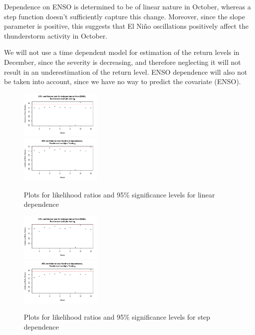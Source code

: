 \documentclass[10pt,conference,compsocconf]{IEEEtran}
\begin{document}
Dependence on ENSO is determined to be of linear nature in October, whereas a step function doesn't sufficiently capture this change. Moreover, since the slope parameter is positive, this suggests that El Niño oscillations positively affect the thunderstorm activity in October. 
\par
We will not use a time dependent model for estimation of the return levels in December, since the severity is decreasing, and therefore neglecting it will not result in an underestimation of the return level.
ENSO dependence will also not be taken into account, since we have no way to predict the covariate (ENSO).

\begin{figure}
	\centering
	\includegraphics[width=0.35\textwidth]{../plots/enso_dependance.pdf}\\
	\includegraphics[width=0.35\textwidth]{../plots/time_dependance.pdf}
	\caption{Plots for likelihood ratios and 95\% significance levels for linear dependence}
	\label{fig:dependance_test}
\end{figure}

\begin{figure}
	\centering
	\includegraphics[width=0.35\textwidth]{../plots/enso_dependance_step.pdf}\\
	\includegraphics[width=0.35\textwidth]{../plots/time_dependance_step.pdf}
	\caption{Plots for likelihood ratios and 95\% significance levels for step dependence}
	\label{fig:dependence_test_step}
\end{figure}
\end{document}

